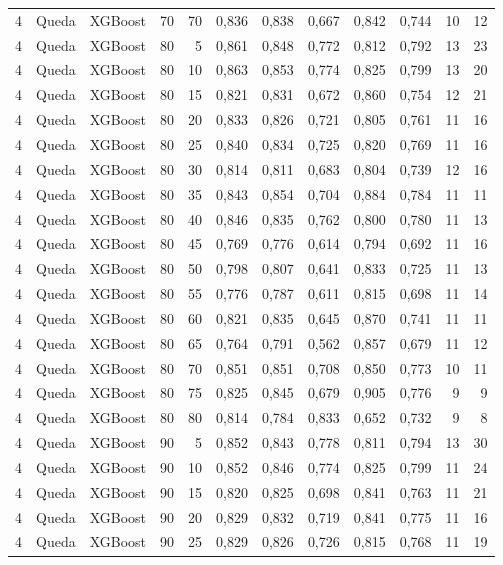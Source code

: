 \begin{longtable}{ccclrrrrrrrr}
4 & Queda & XGBoost & 70 & 70 & 0,836 & 0,838 & 0,667 & 0,842 & 0,744 & 10 & 12 \\
4 & Queda & XGBoost & 80 & 5 & 0,861 & 0,848 & 0,772 & 0,812 & 0,792 & 13 & 23 \\
4 & Queda & XGBoost & 80 & 10 & 0,863 & 0,853 & 0,774 & 0,825 & 0,799 & 13 & 20 \\
4 & Queda & XGBoost & 80 & 15 & 0,821 & 0,831 & 0,672 & 0,860 & 0,754 & 12 & 21 \\
4 & Queda & XGBoost & 80 & 20 & 0,833 & 0,826 & 0,721 & 0,805 & 0,761 & 11 & 16 \\
4 & Queda & XGBoost & 80 & 25 & 0,840 & 0,834 & 0,725 & 0,820 & 0,769 & 11 & 16 \\
4 & Queda & XGBoost & 80 & 30 & 0,814 & 0,811 & 0,683 & 0,804 & 0,739 & 12 & 16 \\
4 & Queda & XGBoost & 80 & 35 & 0,843 & 0,854 & 0,704 & 0,884 & 0,784 & 11 & 11 \\
4 & Queda & XGBoost & 80 & 40 & 0,846 & 0,835 & 0,762 & 0,800 & 0,780 & 11 & 13 \\
4 & Queda & XGBoost & 80 & 45 & 0,769 & 0,776 & 0,614 & 0,794 & 0,692 & 11 & 16 \\
4 & Queda & XGBoost & 80 & 50 & 0,798 & 0,807 & 0,641 & 0,833 & 0,725 & 11 & 13 \\
4 & Queda & XGBoost & 80 & 55 & 0,776 & 0,787 & 0,611 & 0,815 & 0,698 & 11 & 14 \\
4 & Queda & XGBoost & 80 & 60 & 0,821 & 0,835 & 0,645 & 0,870 & 0,741 & 11 & 11 \\
4 & Queda & XGBoost & 80 & 65 & 0,764 & 0,791 & 0,562 & 0,857 & 0,679 & 11 & 12 \\
4 & Queda & XGBoost & 80 & 70 & 0,851 & 0,851 & 0,708 & 0,850 & 0,773 & 10 & 11 \\
4 & Queda & XGBoost & 80 & 75 & 0,825 & 0,845 & 0,679 & 0,905 & 0,776 & 9 & 9 \\
4 & Queda & XGBoost & 80 & 80 & 0,814 & 0,784 & 0,833 & 0,652 & 0,732 & 9 & 8 \\
4 & Queda & XGBoost & 90 & 5 & 0,852 & 0,843 & 0,778 & 0,811 & 0,794 & 13 & 30 \\
4 & Queda & XGBoost & 90 & 10 & 0,852 & 0,846 & 0,774 & 0,825 & 0,799 & 11 & 24 \\
4 & Queda & XGBoost & 90 & 15 & 0,820 & 0,825 & 0,698 & 0,841 & 0,763 & 11 & 21 \\
4 & Queda & XGBoost & 90 & 20 & 0,829 & 0,832 & 0,719 & 0,841 & 0,775 & 11 & 16 \\
4 & Queda & XGBoost & 90 & 25 & 0,829 & 0,826 & 0,726 & 0,815 & 0,768 & 11 & 19 \\

\end{longtable}
